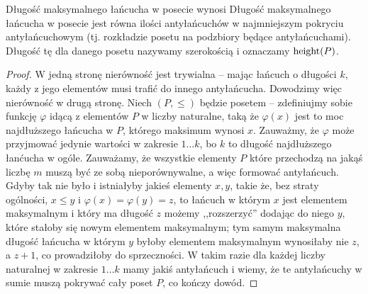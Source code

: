 \begin{theorem}
	Długość maksymalnego łańcucha w posecie wynosi
	Długość maksymalnego łańcucha w posecie jest równa ilości antyłańcuchów w najmniejszym pokryciu antyłańcuchowym
	(tj. rozkładzie posetu na podzbiory będące antyłańcuchami).
	Długość tę dla danego posetu nazywamy szerokością i oznaczamy \(\text{height}(P)\).
\end{theorem}

\begin{proof}
	W jedną stronę nierówność jest trywialna -- mając łańcuch o długości \(k\), każdy z jego
	elementów musi trafić do innego antyłańcucha. Dowodzimy więc nierówność w drugą stronę.
	Niech \((P, \leq)\) będzie posetem -- zdefiniujmy sobie funkcję \(\varphi\) idącą z elementów
	\(P\) w liczby naturalne, taką że \(\varphi(x)\) jest to moc najdłuższego łańcucha w \(P\),
	którego maksimum wynosi \(x\). Zauważmy, że \(\varphi\) może przyjmować jedynie wartości
	w zakresie \(1 \dots k\), bo \(k\) to długość najdłuższego łanćucha w ogóle. Zauważamy,
	że wszystkie elementy \(P\) które przechodzą na jakąś liczbę \(m\) muszą być ze sobą
	nieporównywalne, a więc formować antyłańcuch. Gdyby tak nie było i istniałyby jakieś
	elementy \(x, y\), takie że, bez straty ogólności, \(x \leq y\) i
	\(\varphi(x) = \varphi(y) = z\), to łańcuch w którym \(x\) jest elementem maksymalnym
	i który ma długość \(z\) możemy ,,rozszerzyć'' dodając do niego \(y\), które stałoby się
	nowym elementem maksymalnym; tym samym maksymalna długość łańcucha w którym \(y\)
	byłoby elementem maksymalnym wynosiłaby nie \(z\), a \(z+1\), co prowadziłoby do sprzeczności.
	W takim razie dla każdej liczby naturalnej w zakresie \(1 \dots k\) mamy jakiś antyłańcuch
	i wiemy, że te antyłańcuchy w sumie muszą pokrywać cały poset \(P\), co kończy dowód.
\end{proof}
